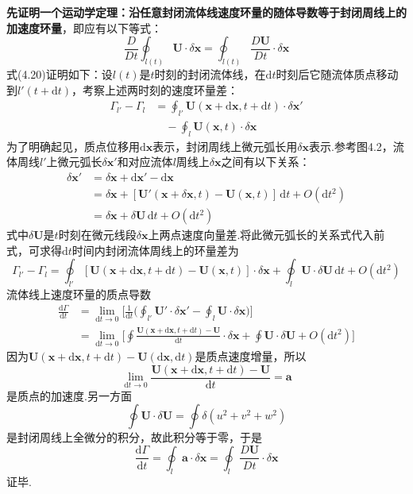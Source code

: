 \textbf{先证明一个运动学定理：沿任意封闭流体线速度环量的随体导数等于封闭周线上的加速度环量}，即应有以下等式：
\begin{equation*}
\frac{D}{Dt}\oint_{l(t)}\boldsymbol{U}\cdot\delta\boldsymbol{x}=\oint_{l(t)}\frac{D\boldsymbol{U}}{Dt}\cdot\delta\boldsymbol{x}
\tag{4.20}
\end{equation*}
式(4.20)证明如下：设$l(t)$是$t$时刻的封闭流体线，在$\mathrm{d}t$时刻后它随流体质点移动到$l'(t+\mathrm{d}t)$，考察上述两时刻的速度环量差：
\begin{align*}
\Gamma_{l'}-\Gamma_l&=\oint_{l'}\boldsymbol{U}(\boldsymbol{x}+\mathrm{d}\boldsymbol{x},t+\mathrm{d}t)\cdot\delta\boldsymbol{x}'\\
&\quad-\oint_l\boldsymbol{U}(\boldsymbol{x},t)\cdot\delta\boldsymbol{x}
\end{align*}
为了明确起见，质点位移用$\mathrm{d}\boldsymbol{x}$表示，封闭周线上微元弧长用$\delta\boldsymbol{x}$表示.参考图4.2，流体周线$l'$上微元弧长$\delta\boldsymbol{x}'$和对应流体$l$周线上$\delta\boldsymbol{x}$之间有以下关系：
\begin{align*}
\delta\boldsymbol{x}'&=\delta\boldsymbol{x}+\mathrm{d}\boldsymbol{x}'-\mathrm{d}\boldsymbol{x}\\
&=\delta\boldsymbol{x}+[\boldsymbol{U}'(\boldsymbol{x}+\delta\boldsymbol{x},t)-\boldsymbol{U}(\boldsymbol{x},t)]\,\mathrm{d}t+O(\mathrm{d}t^{2})\\
&=\delta\boldsymbol{x}+\delta\boldsymbol{U}\,\mathrm{d}t+O(\mathrm{d}t^{2})
\end{align*}
式中$\delta\boldsymbol{U}$是$t$时刻在微元线段$\delta\boldsymbol{x}$上两点速度向量差.将此微元弧长的关系式代入前式，可求得$\mathrm{d}t$时间内封闭流体周线上的环量差为
\[
\Gamma_{l'}-\Gamma_l=\oint_{l'}[\boldsymbol{U}(\boldsymbol{x}+\mathrm{d}\boldsymbol{x},t+\mathrm{d}t)-\boldsymbol{U}(\boldsymbol{x},t)]\cdot\delta\boldsymbol{x}+\oint_l\boldsymbol{U}\cdot\delta\boldsymbol{U}\,\mathrm{d}t+O(\mathrm{d}t^{2})
\]
流体线上速度环量的质点导数
\begin{align*}
\frac{\mathrm{d}\Gamma}{\mathrm{d}t}&=\lim_{\mathrm{d}t\to 0}\bigg[\frac{1}{\mathrm{d}t}\Big(\oint_{l'}\boldsymbol{U}'\cdot\delta\boldsymbol{x}'-\oint_l\boldsymbol{U}\cdot\delta\boldsymbol{x}\Big)\bigg]\\
&=\lim_{\mathrm{d}t\to 0}\bigg[\oint\frac{\boldsymbol{U}(\boldsymbol{x}+\mathrm{d}\boldsymbol{x},t+\mathrm{d}t)-\boldsymbol{U}}{\mathrm{d}t}\cdot\delta\boldsymbol{x}+\oint\boldsymbol{U}\cdot\delta\boldsymbol{U}+O(\mathrm{d}t^{2})\bigg]
\end{align*}
因为$\boldsymbol{U}(\boldsymbol{x}+\mathrm{d}\boldsymbol{x},t+\mathrm{d}t)-\boldsymbol{U}(\mathrm{d}\boldsymbol{x},\mathrm{d}t)$是质点速度增量，所以
\[
\lim_{\mathrm{d}t\to 0}\frac{\boldsymbol{U}(\boldsymbol{x}+\mathrm{d}\boldsymbol{x},t+\mathrm{d}t)-\boldsymbol{U}}{\mathrm{d}t}=\boldsymbol{a}
\]
是质点的加速度.另一方面
\[
\oint\boldsymbol{U}\cdot\delta\boldsymbol{U}=\oint\delta(u^{2}+v^{2}+w^{2})
\]
是封闭周线上全微分的积分，故此积分等于零，于是
\[
\frac{\mathrm{d}\Gamma}{\mathrm{d}t}=\oint_l\boldsymbol{a}\cdot\delta\boldsymbol{x}=\oint_l\frac{D\boldsymbol{U}}{Dt}\cdot\delta\boldsymbol{x}
\]
证毕.

